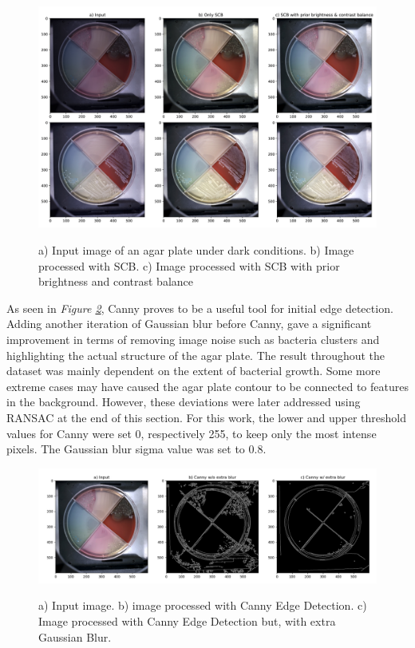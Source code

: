 \begin{figure}[H]
    \centering
    \includegraphics[width=1\linewidth]{figures/PDF/SCB.pdf}\\  
    \caption{a) Input image of an agar plate under dark conditions. b) Image processed with SCB. c) Image processed with SCB with prior brightness and contrast balance  }
    \label{fig:result color balance}
\end{figure}


\noindent As seen in \textit{Figure \ref{fig:result canny}}, Canny proves to be a useful tool for initial edge detection. Adding another iteration of Gaussian blur before Canny, gave a significant improvement in terms of removing image noise such as bacteria clusters and highlighting the actual structure of the agar plate. The result throughout the dataset was mainly dependent on the extent of bacterial growth. Some more extreme cases may have caused the agar plate contour to be connected to features in the background. However, these deviations were later addressed using RANSAC at the end of this section. For this work, the lower and upper threshold values for Canny were set 0, respectively 255, to keep only the most intense pixels. The Gaussian blur sigma value was set to 0.8.

\begin{figure}[H]
    \centering
     \includegraphics[width=1\linewidth]{figures/PDF/Canny.pdf}\\
    \caption{a) Input image. b) image processed with Canny Edge Detection. c) Image processed with Canny Edge Detection but, with extra Gaussian Blur. }
    \label{fig:result canny}
\end{figure}


